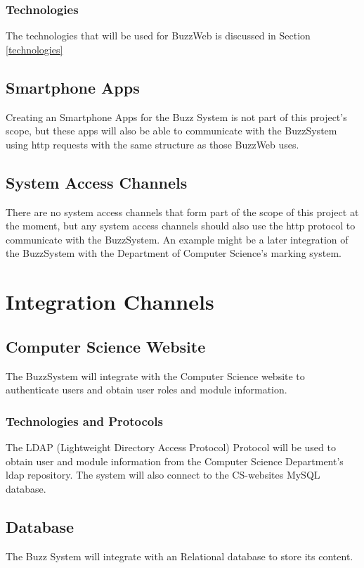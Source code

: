 	\subsubsection{Technologies}
	The technologies that will be used for BuzzWeb is discussed in Section \ref{technologies}

\subsection{Smartphone Apps}
Creating an Smartphone Apps for the Buzz System is not part of this project's scope, but these apps will also be able to communicate with the BuzzSystem using http requests with the same structure as those BuzzWeb uses.

\subsection{System Access Channels}
There are no system access channels that form part of the scope of this project at the moment, but any system access channels should also use the http protocol to communicate with the BuzzSystem. An example might be a later integration of the BuzzSystem with the Department of Computer Science's marking system.


\section{Integration Channels}
\subsection{Computer Science Website}
The BuzzSystem will integrate with the Computer Science website to authenticate users and obtain user roles and module information. 

\subsubsection{Technologies and Protocols}
The LDAP (Lightweight Directory Access Protocol) Protocol will be used to obtain user and module information from the Computer Science Department's ldap repository. The system will also connect to the CS-websites MySQL database.

\subsection{Database}
The Buzz System will integrate with an Relational database to store its content. 

